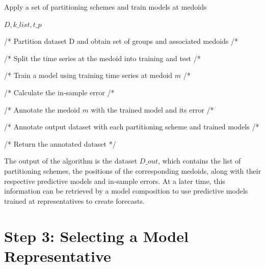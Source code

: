 \begin{algorithm}[h!]
\caption{Apply a set of partitioning schemes and train models at medoids}\label{alg:trainModelsAtMedoids}
\begin{algorithmic}[1] 
 {$D,k\_list,t\_p$}

 

 /* Partition dataset D and obtain set of groups and associated medoids /*
 
 
 /* Split the time series at the medoid into training and test /*
 
 /* Train a model using training time series at medoid $m$ /*
 
 /* Calculate the in-sample error /*
 
 /* Annotate the medoid $m$ with the trained model and its error /*
 \EndFor
 
 /* Annotate output dataset with each partitioning scheme and trained models /*
 
\EndFor

/* Return the annotated dataset */
\EndFunction 
\end{algorithmic} 
\end{algorithm} 

The output of the algorithm is the dataset $D\_out$, which contains the list of partitioning schemes, the positions of the corresponding medoids, along with their respective predictive models and in-sample errors. At a later time, this information can be retrieved by a model composition to use predictive models trained at representatives to create forecasts.

\section{Step 3: Selecting a Model Representative}
\label{Sec:KnowledgExtraction}

